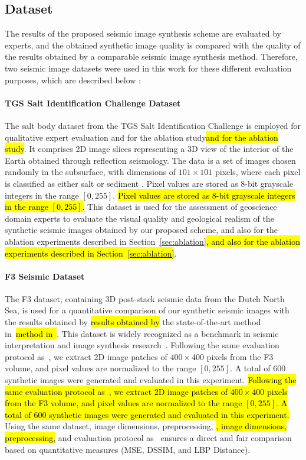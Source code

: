 \documentclass{ieeeaccess}
\makeatletter
\DeclareRobustCommand{\DIFaddbegin}{\DIFOaddbegin \let\includegraphics\DIFaddincludegraphics} %
\DeclareRobustCommand{\DIFaddend}{\DIFOaddend \let\includegraphics\DIFOincludegraphics} %
\DeclareRobustCommand{\DIFdelbegin}{\DIFOdelbegin \let\includegraphics\DIFdelincludegraphics} %
\DeclareRobustCommand{\DIFdelend}{\DIFOaddend \let\includegraphics\DIFOincludegraphics} %
\let\sout@orig\sout %
\renewcommand{\sout}[1]{\ifmmode\text{\sout@orig{\ensuremath{#1}}}\else\sout@orig{#1}\fi} %
\providecommand{\DIFadd}[1]{{\protect\color{blue}#1}}
\providecommand{\DIFdel}[1]{{\protect\color{red}\sout{#1}}}
\renewcommand{\DIFadd}[1]{\ifmmode#1\else\begingroup\let\protect\relax\hl{#1}\endgroup\fi}
\renewcommand{\DIFdel}[1]{}
\providecommand{\DIFaddbegin}{}
\providecommand{\DIFaddend}{}
\providecommand{\DIFdelbegin}{}
\providecommand{\DIFdelend}{}
\renewcommand{\DIFaddbegin}{}
\renewcommand{\DIFaddend}{}
\renewcommand{\DIFdelbegin}{}
\renewcommand{\DIFdelend}{}
\makeatother
\begin{document}
\subsection{Dataset}

The results of the proposed seismic image synthesis scheme are evaluated by experts, and the obtained synthetic image quality is compared with the quality of the results obtained by a comparable seismic image synthesis method. Therefore, two seismic image datasets were used in this work for these different evaluation purposes, which are described below :

\paragraph{TGS Salt Identification Challenge Dataset}

The salt body dataset from the TGS Salt Identification Challenge is employed for qualitative expert evaluation \DIFaddbegin \DIFadd{and for the ablation study}\DIFaddend . It comprises 2D image slices representing a 3D view of the interior of the Earth obtained through reflection seismology. The data is a set of images chosen randomly in the subsurface, with dimensions of $101 \times 101$ pixels, where each pixel is classified as either salt or sediment \cite{TGS2023}. \DIFaddbegin \DIFadd{Pixel values are stored as 8-bit grayscale integers in the range $[0, 255]$. }\DIFaddend This dataset is used for the assessment of geoscience domain experts to evaluate the visual quality and geological realism of the synthetic seismic images obtained by our proposed scheme\DIFaddbegin \DIFadd{, and also for the ablation experiments described in Section~\protect\ref{sec:ablation}}\DIFaddend .

\paragraph{F3 Seismic Dataset}

The F3 dataset, containing 3D post-stack seismic data from the Dutch North Sea, is used for a quantitative comparison of \DIFdelbegin \DIFdel{the quality of }\DIFdelend our synthetic seismic images with the \DIFdelbegin \DIFdel{image quality obtained by a comparable method representing }\DIFdelend \DIFaddbegin \DIFadd{results obtained by }\DIFaddend the state-of-the-art \DIFdelbegin \DIFdel{proposed by }\DIFdelend \DIFaddbegin \DIFadd{method in~}\DIFaddend \cite{Ferreira2020}. This dataset is widely recognized as a benchmark in seismic interpretation and image synthesis research~\cite{Baroni2018}. \DIFaddbegin \DIFadd{Following the same evaluation protocol as~\cite{Ferreira2020}, we extract 2D image patches of $400 \times 400$ pixels from the F3 volume, and pixel values are normalized to the range $[0, 255]$. A total of 600 synthetic images were generated and evaluated in this experiment. }\DIFaddend Using the same dataset\DIFaddbegin \DIFadd{, image dimensions, preprocessing, }\DIFaddend and evaluation protocol as\DIFdelbegin \DIFdel{the method in}\DIFdelend ~\cite{Ferreira2020} ensures a direct and fair comparison based on quantitative measures (MSE, DSSIM, and LBP Distance).
\end{document}
